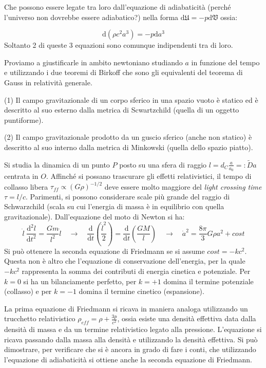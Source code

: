 Che possono essere legate tra loro dall'equazione di adiabaticità (perché l'universo non dovrebbe essere adiabatico?) nella forma $\mathrm{d}\mathfrak{U}=-p\mathrm{d}\mathfrak{V}$ ossia:

\begin{equation}
    \mathrm{d}(\rho c^2 a^3)=-p\mathrm{d}a^3
\end{equation}
Soltanto 2 di queste 3 equazioni sono comunque indipendenti tra di loro.

\vspace*{1em}
Proviamo a giustificarle in ambito newtoniano studiando $a$ in funzione del tempo e utilizzando i due teoremi di Birkoff che sono gli equivalenti del teorema di Gauss in relatività generale.
\begin{theorem}
(1) Il campo gravitazionale di un corpo sferico in una spazio vuoto è statico ed è descritto al suo esterno dalla metrica di Scwartzchild (quella di un oggetto puntiforme).

(2) Il campo gravitazionale prodotto da un guscio sferico (anche non statico) è descritto al suo interno dalla metrica di Minkowski (quella dello spazio piatto).
\end{theorem}

Si studia la dinamica di un punto $P$ posto su una sfera di raggio $l=d_C \frac{a}{a_0}=:\tilde{D}a$ centrata in $O$. Affinché si possano trascurare gli effetti relativistici, il tempo di collasso libera $\tau_{ff}\propto (G\rho)^{-1/2}$ deve essere molto maggiore del \textit{light crossing time} $\tau =l / c$. Parimenti, si possono considerare scale più grande del raggio di Schwarzchild (scala su cui l'energia di massa è in equilibrio con quella gravitazionale). Dall'equazione del moto di Newton si ha:
$$
\dot{l}\:\frac{\mathrm{d^2} l}{\mathrm{d} t^2}=\frac{Gm}{l^2}\dot{l} \quad \rightarrow \quad \frac{\mathrm{d} }{\mathrm{d} t}\left ( \frac{\dot{l}^2}{2} \right )=\frac{\mathrm{d} }{\mathrm{d} t}\left ( \frac{GM}{l} \right ) \quad \rightarrow \quad \dot{a}^2 =\frac{8\pi}{3}G\rho a^2+cost
$$
Si può ottenere la seconda equazione di Friedmann se si assume $cost=-kc^2$. Questa non è altro che l'equazione di conservazione dell'energia, per la quale $-kc^2$ rappresenta la somma dei contributi di energia cinetica e potenziale. Per $k=0$ si ha un bilanciamente perfetto, per $k=+1$ domina il termine potenziale (collasso) e per $k=-1$ domina il termine cinetico (espansione).

La prima equazione di Friedmann si ricava in maniera analoga utilizzando un trucchetto relativistico $\rho_{eff}=\rho+\frac{3p}{c^2}$, ossia esiste una densità effettiva data dalla densità di massa e da un termine relativistico legato alla pressione. L'equazione si ricava passando dalla massa alla densità e utilizzando la densità effettiva.
Si può dimostrare, per verificare che si è ancora in grado di fare i conti, che utilizzando l'equazione di adiabaticità si ottiene anche la seconda equazione di Friedmann.


